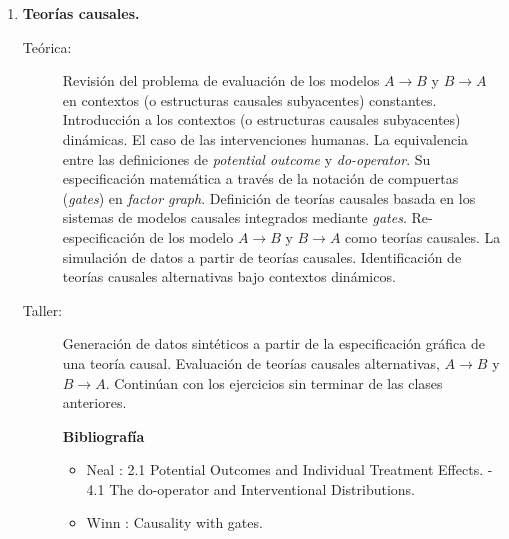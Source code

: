 \documentclass[10pt]{article}
\begin{document}
\begin{enumerate}
\vspace{0.1cm}
\item \textbf{Teorías causales.}
\vspace{-0.15cm}
\begin{description}
\item[Teórica:]
Revisión del problema de evaluación de los modelos $A\rightarrow B$ y $B\rightarrow A$ en contextos (o estructuras causales subyacentes) constantes.
Introducción a los contextos (o estructuras causales subyacentes) dinámicas.
El caso de las intervenciones humanas.
La equivalencia entre las definiciones de \emph{potential outcome} y \emph{do-operator}.
Su especificación matemática a través de la notación de compuertas (\emph{gates}) en \emph{factor graph}.
Definición de teorías causales basada en los sistemas de modelos causales integrados mediante \emph{gates}.
Re-especificación de los modelo $A\rightarrow B$ y $B\rightarrow A$ como teorías causales.
La simulación de datos a partir de teorías causales.
Identificación de teorías causales alternativas bajo contextos dinámicos.
\item[Taller:] Generación de datos sintéticos a partir de la especificación gráfica de una teoría causal.
Evaluación de teorías causales alternativas, $A\rightarrow B$ y $B\rightarrow A$. Continúan con los ejercicios sin terminar de las clases anteriores.
\item[] \textbf{Bibliografía}
\begin{itemize}
\item Neal \cite{neal2020}: 2.1 Potential Outcomes and Individual Treatment Effects. - 4.1 The do-operator and Interventional Distributions.
\item Winn \cite{winn2012-causality}: Causality with gates.
\end{itemize}
\end{description}



\end{enumerate}
\end{document}
